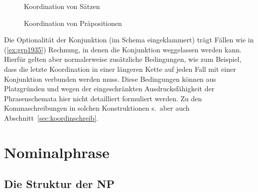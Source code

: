 \begin{figure}[!htbp]
  \centering
  \caption{Koordination von Sätzen}
  \label{fig:koorsatz}
\end{figure}

\begin{figure}[!htbp]
  \centering
  \caption{Koordination von Präpositionen}
  \label{fig:koorpraep}
\end{figure}

Die Optionalität der Konjunktion (im Schema eingeklammert) trägt Fällen wie in (\ref{ex:grp1935}) Rechnung, in denen die Konjunktion weggelassen werden kann.
Hierfür gelten aber normalerweise zusätzliche Bedingungen, wie zum Beispiel, dass die letzte Koordination in einer längeren Kette auf jeden Fall mit einer Konjunktion verbunden werden muss.
Diese Bedingungen können aus Platzgründen und wegen der eingeschränkten Ausdrucksfähigkeit der Phrasenschemata hier nicht detailliert formuliert werden.
Zu den Kommaschreibungen in solchen Konstruktionen s.\ aber auch Abschnitt~\ref{sec:koordinschreib}.

\begin{exe}
\end{exe}




\section{Nominalphrase}

\label{sec:ngr}

\subsection{Die Struktur der NP}

